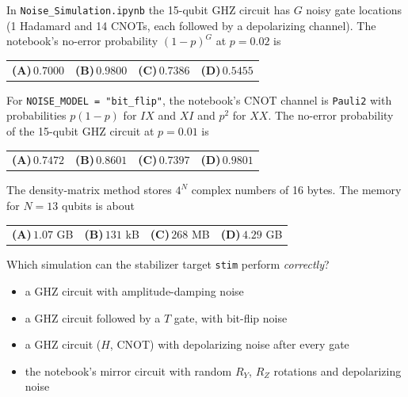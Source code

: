 \documentclass[11pt,a4paper]{article}
\newcommand{\optlabel}[1]{\textbf{(#1)}}
\newenvironment{qitem}[1]{\begin{list}{}{\setlength{\leftmargin}{3.3em}\setlength{\labelwidth}{3.1em}%
  \setlength{\labelsep}{0.2em}\setlength{\topsep}{3pt}\setlength{\parsep}{3pt}}\item[\textbf{Q.#1}\hfill]}{\end{list}}
\newcommand{\qsep}{\par\vspace{2pt}{\color{black!15}\hrule}\vspace{4pt}}
\begin{document}
\begin{qitem}{46}
In \texttt{Noise\_Simulation.ipynb} the 15-qubit GHZ circuit has $G$ noisy gate locations (1 Hadamard and 14 CNOTs, each followed by a depolarizing channel).
The notebook's no-error probability $(1 - p)^G$ at $p = 0.02$ is
\par\smallskip\noindent\begin{tabularx}{\linewidth}{@{}*{4}{L}@{}}
\optlabel{A}\,$0.7000$ & \optlabel{B}\,$0.9800$ & \optlabel{C}\,$0.7386$ & \optlabel{D}\,$0.5455$
\end{tabularx}
\end{qitem}
\qsep

\begin{qitem}{47}
For \texttt{NOISE\_MODEL = "bit\_flip"}, the notebook's CNOT channel is \texttt{Pauli2} with probabilities $p(1-p)$ for $IX$ and $XI$ and $p^2$ for $XX$. The
no-error probability of the 15-qubit GHZ circuit at $p = 0.01$ is
\par\smallskip\noindent\begin{tabularx}{\linewidth}{@{}*{4}{L}@{}}
\optlabel{A}\,$0.7472$ & \optlabel{B}\,$0.8601$ & \optlabel{C}\,$0.7397$ & \optlabel{D}\,$0.9801$
\end{tabularx}
\end{qitem}
\qsep

\begin{qitem}{48}
The density-matrix method stores $4^N$ complex numbers of 16 bytes. The memory for $N = 13$ qubits is about
\par\smallskip\noindent\begin{tabularx}{\linewidth}{@{}*{4}{L}@{}}
\optlabel{A}\,$1.07$ GB & \optlabel{B}\,$131$ kB & \optlabel{C}\,$268$ MB & \optlabel{D}\,$4.29$ GB
\end{tabularx}
\end{qitem}
\qsep

\begin{qitem}{49}
Which simulation can the stabilizer target \texttt{stim} perform \emph{correctly}?
\begin{itemize}[leftmargin=2.6em, labelsep=0.4em, itemsep=2pt, topsep=3pt]
\item[\optlabel{A}] a GHZ circuit with amplitude-damping noise
\item[\optlabel{B}] a GHZ circuit followed by a $T$ gate, with bit-flip noise
\item[\optlabel{C}] a GHZ circuit ($H$, CNOT) with depolarizing noise after every gate
\item[\optlabel{D}] the notebook's mirror circuit with random $R_Y$, $R_Z$ rotations and depolarizing noise
\end{itemize}
\end{qitem}
\qsep
\end{document}
